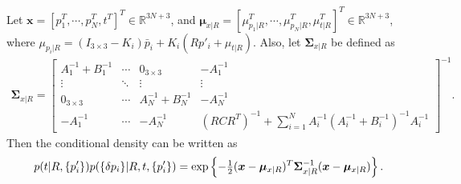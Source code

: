 \begin{lemma} \label{lemma:VIO-likelihood-tp}
	Let $\bm{x} = \left[p_1^T, \cdots, p_N^T, t^T\right]^T \in \mathbb{R}^{3N+3}$, and $\bm{\mu}_{x|R} = \left[\mu_{p_1|R}^T, \cdots, \mu_{p_N|R}^T, \mu_{t|R}^T\right]^T \in \mathbb{R}^{3N+3}$, where $\mu_{p_i|R} = (I_{3\times 3}-K_i)\bar{p}_i + K_i(Rp'_i+\mu_{t|R})$.
	Also, let $\bm{\Sigma}_{x|R}$ be defined as
	\begin{align} \label{eqn:VIO-likelihood-map-Sigmax}
		\bm{\Sigma}_{x|R} = \begin{bmatrix}
			A_1^{-1}+B_1^{-1} & \cdots & 0_{3\times 3} & -A_1^{-1} \\
			\vdots & \ddots & \vdots & \vdots \\
			0_{3\times 3} & \cdots & A_N^{-1}+B_N^{-1} & -A_N^{-1} \\
			-A_1^{-1} & \cdots & -A_N^{-1} & (RCR^T)^{-1} + \sum_{i=1}^N A_i^{-1}\left( A_i^{-1}+B_i^{-1} \right)^{-1} A_i^{-1}
		\end{bmatrix}^{-1}.
	\end{align}
	Then the conditional density can be written as
	\begin{align} \label{eqn:VIO-likelihood-map-tp}
		p(t|R,\{p'_i\}) p(\{\delta p_i\}|R,t,\{p'_i\}) = \exp\left\{ -\tfrac{1}{2} (\bm{x}-\bm{\mu}_{x|R})^T \bm{\Sigma}_{x|R}^{-1} (\bm{x}-\bm{\mu}_{x|R}) \right\}.
	\end{align}
\end{lemma}
